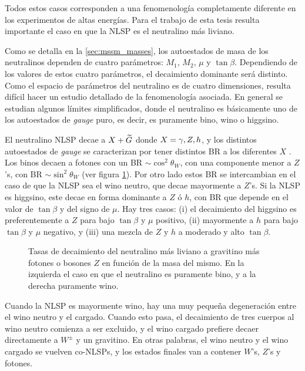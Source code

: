 Todos estos casos corresponden a una fenomenología completamente diferente en
los experimentos de altas energías. Para el trabajo de esta tesis resulta
importante el caso en que la NLSP es el neutralino más liviano.

Como se detalla en la \cref{sec:mssm_masses}, los autoestados de masa de los
neutralinos dependen de cuatro parámetros: $M_1$, $M_2$, $\mu$ y $\tan\beta$.
Dependiendo de los valores de estos cuatro parámetros, el decaimiento dominante
será distinto. Como el espacio de parámetros del neutralino es de cuatro
dimensiones, resulta difícil hacer un estudio detallado de la fenomenología asociada.
En general se estudian algunos límites simplificados, donde el neutralino
es básicamente uno de los autoestados de \emph{gauge} puro, es decir, es puramente
bino, wino o higgsino. %

El neutralino NLSP decae a $X + \widetilde{G}$ donde $X=\gamma,Z,h$, y los distintos
autoestados de \emph{gauge} se caracterizan por tener distintos BR a los diferentes $X$
\cite{Ruderman:2011vv}.
Los binos decaen a fotones con un BR $\sim \cos^2\theta_W$, con una componente
menor a $Z$'s, con BR $\sim \sin^2\theta_W$ (ver figura
\cref{fig:bino_wino_br}). Por otro lado estos BR se intercambian en el caso de
que la NLSP sea el wino neutro, que decae mayormente a $Z$'s. Si la NLSP es
higgsino, este decae en forma dominante a $Z$ ó $h$, con BR que depende en el
valor de $\tan\beta$ y del signo de $\mu$. Hay tres casos: (i) el decaimiento
del higgsino es preferentemente a $Z$ para bajo $\tan\beta$ y $\mu$ positivo,
(ii) mayormente a $h$ para bajo $\tan\beta$ y $\mu$ negativo, y (iii) una mezcla
de $Z$ y $h$ a moderado y alto $\tan\beta$.

\begin{figure}[!h]
  \centering

  
  

  \caption{Tasas de decaimiento del neutralino más liviano a gravitino más
    fotones o bosones $Z$ en función de la masa del mismo. En la izquierda el
    caso en que el neutralino es puramente bino, y a la derecha puramente wino.}
  \label{fig:bino_wino_br}
\end{figure}

Cuando la NLSP es mayormente wino, hay una muy pequeña degeneración entre el
wino neutro y el cargado. Cuando esto pasa, el decaimiento de tres cuerpos al
wino neutro comienza a ser excluido, y el wino cargado prefiere decaer
directamente a $W^{\pm}$ y un gravitino. En otras palabras, el wino neutro y el
wino cargado se vuelven co-NLSPs, y los estados finales van a contener $W$'s,
$Z$'s y fotones.

